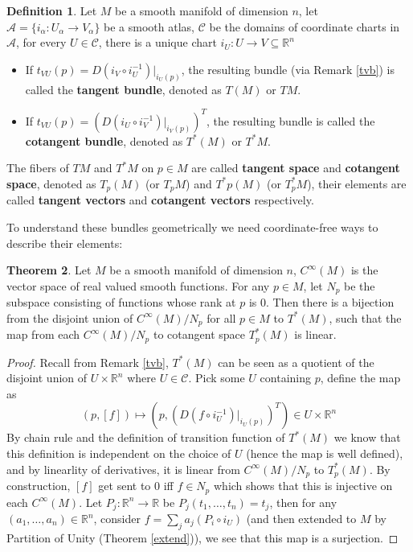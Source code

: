 \documentclass{article}
\theoremstyle{definition}
\newtheorem{thm}{Theorem}[section]
\newtheorem{dfn}[thm]{Definition}
\begin{document}
\begin{dfn}
    Let $M$ be a smooth manifold of dimension $n$, let $\mathcal{A}=\{i_\alpha: U_\alpha\rightarrow V_\alpha\}$ be a smooth atlas, $\mathcal{C}$ be the domains of coordinate charts in $\mathcal{A}$, for every $U\in\mathcal{C}$, there is a unique chart $i_U: U\rightarrow V\subseteq\mathbb{R}^n$
    \begin{itemize}
    \item If $t_{VU}(p)=D(i_V\circ i_U^{-1})|_{i_U(p)}$, the resulting bundle (via Remark \ref{tvb}) is called the {\bf tangent bundle}, denoted as $T(M)$ or $TM$.
    \item If $t_{VU}(p)=(D(i_U\circ i_V^{-1})|_{i_V(p)})^T$, the resulting bundle is called the {\bf cotangent bundle}, denoted as $T^*(M)$ or $T^*M$.
    \end{itemize}
    The fibers of $TM$ and $T^*M$ on $p\in M$ are called {\bf tangent space} and {\bf cotangent space}, denoted as $T_p(M)$ (or $T_pM$) and $T^*p(M)$ (or $T^*_pM$), their elements are called {\bf tangent vectors} and {\bf cotangent vectors} respectively. 
\end{dfn}

To understand these bundles geometrically we need coordinate-free ways to describe their elements:

\begin{thm}\label{coordfree1}
    Let $M$ be a smooth manifold of dimension $n$, $C^\infty(M)$ is the vector space of real valued smooth functions. For any $p\in M$, let $N_p$ be the subspace consisting of functions whose rank at $p$ is $0$. Then there is a bijection from the disjoint union of $C^\infty(M)/N_p$ for all $p\in M$ to $T^*(M)$, such that the map from each $C^\infty(M)/N_p$ to cotangent space $T^*_p(M)$ is linear.
\end{thm}

\begin{proof}
    Recall from Remark \ref{tvb}, $T^*(M)$ can be seen as a quotient of the disjoint union of $U\times\mathbb{R}^n$ where $U\in\mathcal{C}$. Pick some $U$ containing $p$, define the map as \[(p, [f])\mapsto (p, (D(f\circ i_U^{-1})|_{i_U(p)})^T)\in U\times\mathbb{R}^n\]
    By chain rule and the definition of transition function of $T^*(M)$ we know that this definition is independent on the choice of $U$ (hence the map is well defined), and by linearlity of derivatives, it is linear from $C^\infty(M)/N_p$ to $T^*_p(M)$. By construction, $[f]$ get sent to $0$ iff $f\in N_p$ which shows that this is injective on each $C^\infty(M)$. Let $P_j: \mathbb{R}^n\rightarrow \mathbb{R}$ be $P_j(t_1, \dots, t_n)=t_j$, then for any $(a_1, \dots, a_n)\in \mathbb{R}^n$, consider $f=\sum_ja_j(P_i\circ i_U)$ (and then extended to $M$ by Partition of Unity (Theorem \ref{extend})), we see that this map is a surjection.
\end{proof}
\end{document}
